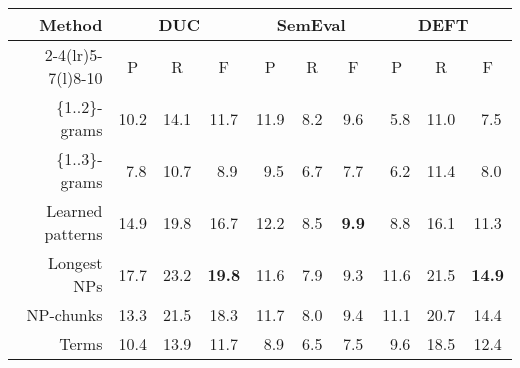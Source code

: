       \begin{table*}
        \centering
        \begin{tabular}{@{~}rccccccccc@{~}}
          \toprule
          \multirow{2}{*}[-2pt]{\textbf{Method}} & \multicolumn{3}{c}{\textbf{DUC}} & \multicolumn{3}{c}{\textbf{SemEval}} & \multicolumn{3}{c}{\textbf{DEFT}}\\
          \cmidrule(r){2-4}\cmidrule(lr){5-7}\cmidrule(l){8-10}
          & P & R & F & P & R & F & P & R & F\\
          \midrule
          \{1..2\}-grams & 10.2 & 14.1 & 11.7 & 11.9 & $~~$8.2 & $~~$9.6 & $~~$5.8 & 11.0 & $~~$7.5\\
          \{1..3\}-grams & $~~$7.8 & 10.7 & $~~$8.9 & $~~$9.5 & $~~$6.7 & $~~$7.7 & $~~$6.2 & 11.4 & $~~$8.0\\
          Learned patterns & 14.9 & 19.8 & 16.7 & 12.2 & $~~$8.5 & \textbf{$~~$9.9} & $~~$8.8 & 16.1 & 11.3\\
          Longest NPs & 17.7 & 23.2 & \textbf{19.8} & 11.6 & $~~$7.9 & $~~$9.3 & 11.6 & 21.5 & \textbf{14.9}\\
          NP-chunks & 13.3 & 21.5 & 18.3 & 11.7 & $~~$8.0 & $~~$9.4 & 11.1 & 20.7 & 14.4\\
          Terms & 10.4 & 13.9 & 11.7 & $~~$8.9 & $~~$6.5 & $~~$7.5 & $~~$9.6 & 18.5 & 12.4\\
          \bottomrule
        \end{tabular}
        \caption{Comparison of candidate extraction methods, when extracting 10
                 keyphrases with \textbf{TopicRank}.
                 \label{tab:topicrank_results}}
      \end{table*}
